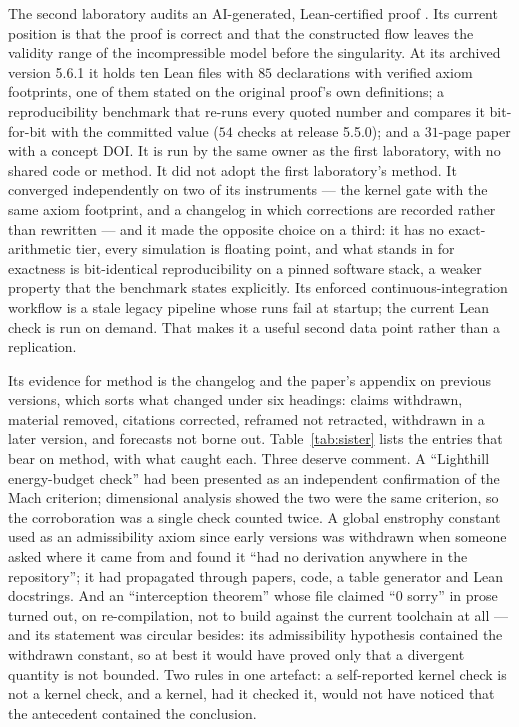 \documentclass[11pt]{article}
\begin{document}
The second laboratory audits an AI-generated, Lean-certified proof \cite{openai2026}. Its
current position \cite{callens2026reading} is that the proof is correct and that the
constructed flow leaves the validity range of the incompressible model before the singularity.
At its archived version 5.6.1 it holds ten Lean files with $85$ declarations with verified
axiom footprints, one of them stated on the original proof's own definitions; a
reproducibility benchmark that re-runs every quoted number and compares it bit-for-bit with
the committed value ($54$ checks at release 5.5.0); and a $31$-page paper with a concept
DOI. It is run by the same owner as the
first laboratory, with no shared code or method. It did not adopt the first laboratory's
method. It converged independently on two of its instruments --- the kernel gate with the same
axiom footprint, and a changelog in which corrections are recorded rather than rewritten ---
and it made the opposite choice on a third: it has no exact-arithmetic tier, every simulation
is floating point, and what stands in for exactness is bit-identical reproducibility on a
pinned software stack, a weaker property that the benchmark states explicitly. Its enforced
continuous-integration workflow is a stale legacy pipeline whose runs fail at startup; the
current Lean check is run on demand. That makes it a useful second data point rather than a
replication.

Its evidence for method is the changelog and the paper's appendix on previous versions, which
sorts what changed under six headings: claims withdrawn, material removed, citations
corrected, reframed not retracted, withdrawn in a later version, and forecasts not borne out.
Table~\ref{tab:sister} lists the entries that bear on method, with what caught each. Three
deserve comment. A ``Lighthill energy-budget check'' had been presented as an independent
confirmation of the Mach criterion; dimensional analysis showed the two were the same
criterion, so the corroboration was a single check counted twice. A global enstrophy constant
used as an admissibility axiom since early versions was withdrawn when someone asked where it
came from and found it ``had no derivation anywhere in the repository''; it had propagated
through papers, code, a table generator and Lean docstrings. And an ``interception theorem''
whose file claimed ``0 sorry'' in prose turned out, on re-compilation, not to build against the
current toolchain at all --- and its statement was circular besides: its admissibility
hypothesis contained the withdrawn constant, so at best it would have proved only that a
divergent quantity is not bounded. Two rules in one artefact: a self-reported kernel check is
not a kernel check, and a kernel, had it checked it, would not have noticed that the
antecedent contained the conclusion.
\end{document}
